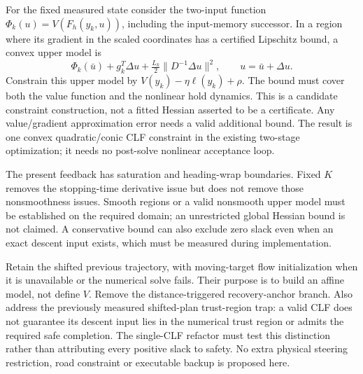 \documentclass[11pt]{article}
\begin{document}
For the fixed measured state consider the two-input function
$\Phi_k(u)=V(F_h(y_k,u))$, including the input-memory successor. In a region
where its gradient in the scaled coordinates has a certified Lipschitz bound,
a convex upper model is
\[
 \Phi_k(\bar u)+g_k^T\Delta u+\tfrac{L_k}{2}\|D^{-1}\Delta u\|^2,
 \qquad u=\bar u+\Delta u.
\]
Constrain this upper model by $V(y_k)-\eta\ell(y_k)+\rho$. The bound must cover
both the value function and the nonlinear hold dynamics. This is a candidate
constraint construction, not a fitted Hessian asserted to be a certificate.
Any value/gradient approximation error needs a valid additional bound. The
result is one convex quadratic/conic CLF constraint in the existing two-stage
optimization; it needs no post-solve nonlinear acceptance loop.

The present feedback has saturation and heading-wrap boundaries. Fixed $K$
removes the stopping-time derivative issue but does not remove those
nonsmoothness issues. Smooth regions or a valid nonsmooth upper model must be
established on the required domain; an unrestricted global Hessian bound is
not claimed. A conservative bound can also exclude zero slack even when an
exact descent input exists, which must be measured during implementation.

Retain the shifted previous trajectory, with moving-target flow initialization
when it is unavailable or the numerical solve fails. Their purpose is to build
an affine model, not define $V$. Remove the distance-triggered recovery-anchor
branch. Also address the previously measured shifted-plan trust-region trap:
a valid CLF does not guarantee its descent input lies in the numerical trust
region or admits the required safe completion. The single-CLF refactor must
test this distinction rather than attributing every positive slack to safety.
No extra physical steering restriction, road constraint or executable backup
is proposed here.
\end{document}
